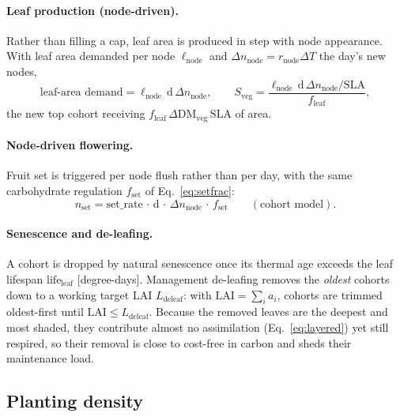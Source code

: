 \documentclass[11pt,a4paper]{article}
\begin{document}
\paragraph{Leaf production (node-driven).} Rather than filling a cap, leaf area is produced in step
with node appearance. With leaf area demanded per node $\ell_{\text{node}}$ and $\Delta n_{\text{node}}
= r_{\text{node}}\Delta T$ the day's new nodes,
\begin{equation}
  \text{leaf-area demand} = \ell_{\text{node}}\,\mathrm{d}\,\Delta n_{\text{node}},\qquad
  S_{\text{veg}} = \frac{\ell_{\text{node}}\,\mathrm{d}\,\Delta n_{\text{node}}/\mathrm{SLA}}{f_{\text{leaf}}},
\end{equation}
the new top cohort receiving $f_{\text{leaf}}\,\Delta\mathrm{DM}_{\text{veg}}\,\mathrm{SLA}$ of area.
\paragraph{Node-driven flowering.} Fruit set is triggered per node flush rather than per day, with the
same carbohydrate regulation $f_{\text{set}}$ of Eq.~\eqref{eq:setfrac}:
\begin{equation}
  n_{\text{set}} = \mathrm{set\_rate}\,\cdot\,\mathrm{d}\,\cdot\,\Delta n_{\text{node}}\,\cdot\, f_{\text{set}}
  \qquad(\text{cohort model}).
  \label{eq:nset_cohort}
\end{equation}
\paragraph{Senescence and de-leafing.} A cohort is dropped by natural senescence once its thermal age
exceeds the leaf lifespan $\mathrm{life}_{\text{leaf}}$ [degree-days]. Management de-leafing removes
the \emph{oldest} cohorts down to a working target LAI $L_{\text{deleaf}}$: with
$\mathrm{LAI}=\sum_i a_i$, cohorts are trimmed oldest-first until $\mathrm{LAI}\le L_{\text{deleaf}}$.
Because the removed leaves are the deepest and most shaded, they contribute almost no assimilation
(Eq.~\eqref{eq:layered}) yet still respired, so their removal is close to cost-free in carbon and
sheds their maintenance load.

\subsection{Planting density}\label{sec:density}
\end{document}
